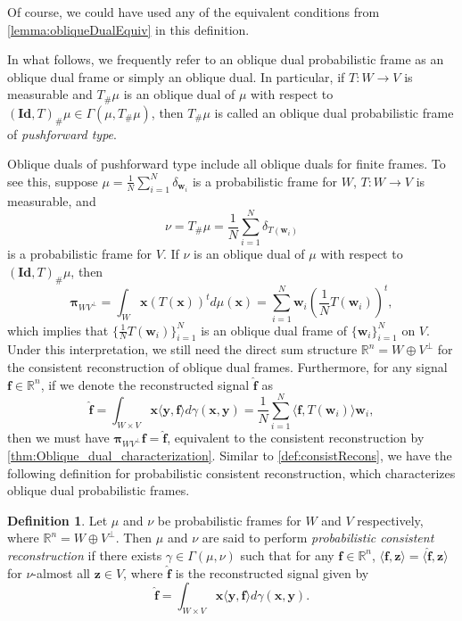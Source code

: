 \documentclass{amsart}
\numberwithin{equation}{section}
\newcommand{\bpi}{{\boldsymbol{\pi}}}
\theoremstyle{plain}
\theoremstyle{remark}
\theoremstyle{definition}
\newtheorem{definition}[theorem]{Definition}
\begin{document}
Of course, we could have used any of the equivalent conditions from \cref{lemma:obliqueDualEquiv} in this definition.

In what follows, we frequently refer to an oblique dual probabilistic frame as an oblique dual frame or simply an oblique dual. 
In particular, if $T: W \rightarrow V$ is measurable and $T_\#\mu$ is an oblique dual of $\mu$ with respect to $(\mathbf{Id}, T)_\#\mu \in \Gamma(\mu, T_\#\mu)$, then $T_\#\mu$ is called an oblique dual probabilistic frame of \emph{pushforward type}. 

Oblique duals of pushforward type include all oblique duals for finite frames. To see this, suppose $\mu = \frac{1}{N} \sum_{i=1}^N \delta_{\mathbf{w}_i}$ is a probabilistic frame for $W$, $T: W \to V$ is measurable, and 
\[
    \nu = T_\#\mu = \frac{1}{N} \sum\limits_{i=1}^N \delta_{T(\mathbf{w}_i)}
\]
is a probabilistic frame for $V$. If $\nu$ is an oblique dual of $\mu$ with respect to $(\mathbf{Id}, T)_\#\mu$, then 
\begin{equation*}
    \bpi_{WV^\perp} = \int_{W} \mathbf{x} \left(T(\mathbf{x})\right)^t d\mu(\mathbf{x}) =  \sum_{i=1}^N \mathbf{w}_{i} \left(\frac{1}{N}T(\mathbf{w}_i)\right)^t,
\end{equation*}
which implies that $\{\frac{1}{N}T(\mathbf{w}_i)\}_{i=1}^N$ is an oblique dual frame of $\{\mathbf{w}_i\}_{i=1}^N$ on $V$. Under this interpretation, we still need the direct sum structure $\mathbb{R}^n = W \oplus V^\perp$ for the consistent reconstruction of oblique dual frames. Furthermore, for any signal $\mathbf{f} \in \mathbb{R}^n$, if we denote the reconstructed signal $\hat{\mathbf{f}}$ as
\begin{equation*}
    \hat{\mathbf{f}} = \int_{W \times V} \mathbf{x} \langle \mathbf{y, f} \rangle d\gamma(\mathbf{x}, \mathbf{y}) = \frac{1}{N} \sum_{i=1}^N \langle  \mathbf{f}, T(\mathbf{w}_i)  \rangle\mathbf{w}_{i}, 
\end{equation*}
then we must have $\bpi_{WV^\perp} \mathbf{f} = \hat{\mathbf{f}}$, equivalent to the consistent reconstruction by \cref{thm:Oblique_dual_characterization}. 
Similar to \cref{def:consistRecons}, we have the following definition for probabilistic consistent reconstruction, which characterizes oblique dual probabilistic frames.  

\begin{definition}\label{def:probabiConsistRecons}
Let $\mu$ and $\nu$ be probabilistic frames for $W$ and $V$ respectively, where $\mathbb{R}^n = W \oplus V^\perp$. Then $\mu$ and $\nu$ are said to perform \emph{probabilistic consistent reconstruction} if there exists $\gamma \in \Gamma(\mu, \nu)$ such that 
for any $\mathbf{f} \in \mathbb{R}^n$,  $\langle \mathbf{f}, \mathbf{z}  \rangle = \langle \hat{\mathbf{f}},  \mathbf{z} \rangle$  for $\nu$-almost all $\mathbf{z} \in V$, where $\hat{\mathbf{f}}$ is the reconstructed signal given by
    \begin{equation*}
        \hat{\mathbf{f}} = \int_{W \times V} \mathbf{x} \langle \mathbf{y, f} \rangle d\gamma(\mathbf{x}, \mathbf{y}).
    \end{equation*}
\end{definition}
\end{document}

